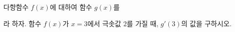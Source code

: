 다항함수 $f(x)$에 대하여 함수 $g(x)$를 \par\smallskip{}\par\smallskip\noindent 라 하자. 함수 $f(x)$가 $x=3$에서 극솟값 $2$를 가질 때, $g'(3)$의 값을 구하시오.
